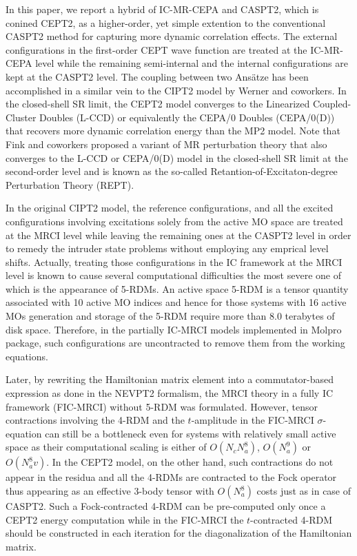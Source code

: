 \documentclass[aip,jcp,amsmath]{revtex4-1}
\begin{document}
%
In this paper, we report a hybrid of IC-MR-CEPA and CASPT2, which is conined CEPT2, as a higher-order, yet simple extention to the conventional CASPT2 method for capturing more dynamic correlation effects.
%
The external configurations in the first-order CEPT wave function are treated at the IC-MR-CEPA level while the remaining semi-internal and the internal configurations are kept at the CASPT2 level.
%
The coupling between two Ans\"atze has been accomplished in a similar vein to the CIPT2 model by Werner and coworkers.\cite{celanithe2004}
%
In the closed-shell SR limit, the CEPT2 model converges to the Linearized Coupled-Cluster Doubles (L-CCD) or equivalently the CEPA/0 Doubles (CEPA/0(D)) that recovers more dynamic correlation energy than the MP2 model.
%
Note that Fink and coworkers proposed a variant of MR perturbation theory\cite{FINK2006461,FINK200939,doi:10.1021/acs.jctc.6b00898} that also converges to the L-CCD or CEPA/0(D) model in the closed-shell SR limit at the second-order level and is known as the so-called Retantion-of-Excitaton-degree Perturbation Theory (REPT).

%
In the original CIPT2 model,\cite{Celani2000,PCMRCI2011} the reference configurations, and all the excited configurations involving excitations solely from the active MO space are treated at the MRCI level while leaving the remaining ones at the CASPT2 level in order to remedy the intruder state problems without employing any emprical level shifts.
%
Actually, treating those configurations in the IC framework at the MRCI level is known to cause several computational difficulties the most severe one of which is the appearance of 5-RDMs.\cite{doi:10.1063/1.443357}
%
An active space 5-RDM is a tensor quantity associated with 10 active MO indices and hence for those systems with 16 active MOs generation and storage of the 5-RDM require more than 8.0 terabytes of disk space.
%
Therefore, in the partially IC-MRCI models\cite{PCMRCI1988,PCMRCI2011} implemented in Molpro package,\cite{Molpro} such configurations are uncontracted to remove them from the working equations.

%
Later, by rewriting the Hamiltonian matrix element into a commutator-based expression as done in the NEVPT2 formalism,\cite{angeliintroduction2001} the MRCI theory in a fully IC framework (FIC-MRCI) without 5-RDM was formulated.\cite{saitowmultireference2013,doi:10.1021/acs.jctc.5b00270,doi:10.1063/1.4907717,doi:10.1063/1.4959029}
%
However, tensor contractions involving the 4-RDM and the $t$-amplitude in the FIC-MRCI $\sigma$-equation can still be a bottleneck even for systems with relatively small active space as their computational scaling is either of $O(N_c N_a^8)$, $O(N_a^9)$ or $O(N_a^8v)$.
%
In the CEPT2 model, on the other hand, such contractions do not appear in the residua and all the 4-RDMs are contracted to the Fock operator thus appearing as an effective 3-body tensor with $O(N_a^8)$ costs just as in case of CASPT2.
%
Such a Fock-contracted 4-RDM can be pre-computed only once a CEPT2 energy computation while in the FIC-MRCI the $t$-contracted 4-RDM should be constructed in each iteration for the diagonalization of the Hamiltonian matrix.
\end{document}
